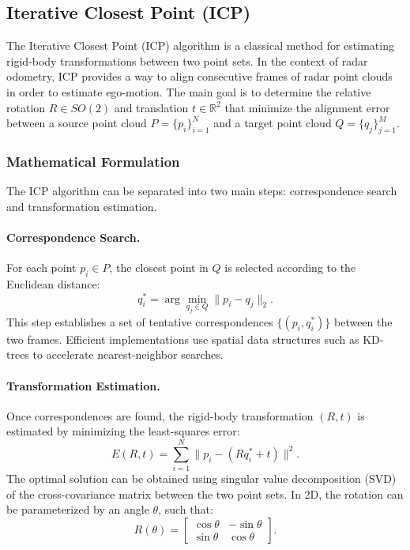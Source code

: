 \subsection{Iterative Closest Point (ICP)}
\label{subsec:icp}

The Iterative Closest Point (ICP) algorithm is a classical method for estimating rigid-body transformations between two point sets. 
In the context of radar odometry, ICP provides a way to align consecutive frames of radar point clouds in order to estimate ego-motion. 
The main goal is to determine the relative rotation $R \in SO(2)$ and translation $t \in \mathbb{R}^2$ that minimize the alignment error between a source point cloud $P = \{p_i\}_{i=1}^N$ and a target point cloud $Q = \{q_j\}_{j=1}^M$.

\subsubsection*{Mathematical Formulation}
The ICP algorithm can be separated into two main steps: correspondence search and transformation estimation.

\paragraph{Correspondence Search.}
For each point $p_i \in P$, the closest point in $Q$ is selected according to the Euclidean distance:
\begin{equation}
    q^*_i = \arg \min_{q_j \in Q} \lVert p_i - q_j \rVert_2.
\end{equation}
This step establishes a set of tentative correspondences $\{(p_i, q^*_i)\}$ between the two frames. 
Efficient implementations use spatial data structures such as KD-trees to accelerate nearest-neighbor searches.

\paragraph{Transformation Estimation.}
Once correspondences are found, the rigid-body transformation $(R,t)$ is estimated by minimizing the least-squares error:
\begin{equation}
    E(R,t) = \sum_{i=1}^{N} \lVert p_i - (R q^*_i + t) \rVert^2.
\end{equation}
The optimal solution can be obtained using singular value decomposition (SVD) of the cross-covariance matrix between the two point sets. 
In 2D, the rotation can be parameterized by an angle $\theta$, such that:
\begin{equation}
    R(\theta) = 
    \begin{bmatrix}
        \cos\theta & -\sin\theta \\
        \sin\theta & \cos\theta
    \end{bmatrix}.
\end{equation}


